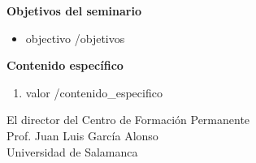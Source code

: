 \documentclass[spanish]{article}
\begin{document}
\textbf{Objetivos del seminario}
\begin{itemize}
{{#objetivos}}
\item {{objectivo}}
{{/objetivos}}
\end{itemize}

\vspace*{0.5cm}

\textbf{Contenido específico}
\begin{enumerate}
{{#contenido_especifico}}
\item {{valor}}
{{/contenido_especifico}}
\end{enumerate}

\vspace*{0.7cm}

\begin{center}
El director del Centro de Formación Permanente\\
\vspace*{3cm}
Prof. Juan Luis García Alonso\\
Universidad de Salamanca
\end{center}
\end{document}
